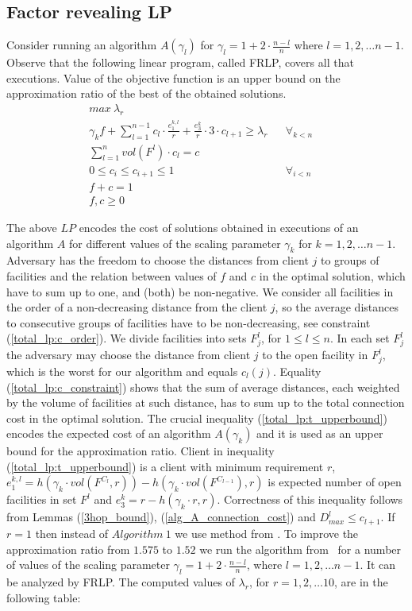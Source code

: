 \documentclass{llncs}
\begin{document}
\subsection{Factor revealing LP}
\label{lp_factor_revel}
Consider running an algorithm $A(\gamma_l)$ for $\gamma_l = 1 + 2 \cdot \frac{n - l}{n}$ where $l = 1, 2, \dots n-1$. Observe that the following linear program, called FRLP, covers all that executions. Value of the objective function is an upper bound on the approximation ratio of the best of the obtained solutions.
\begin{eqnarray}
  \label{total_lp:max}
  max~\lambda_r && \\
\label{total_lp:t_upperbound}
  \gamma_k f + \sum_{l = 1}^{n-1} c_l \cdot \frac{e_1^{k, l}}{r} + \frac{e_3^k}{r} \cdot 3 \cdot c_{l+1} \geq \lambda_r &&  \forall_{k < n}\\
\label{total_lp:c_constraint}
  \sum_{l = 1}^{n}vol(F^l) \cdot c_l = c && \\
\label{total_lp:c_order}
  0 \leq c_i \leq c_{i+1} \leq 1&&\forall_{i < n}~~~~~\\
\label{total_lp:opt_sol}
  f + c = 1 && \\
f, c\geq 0 &&
\end{eqnarray}

The above $LP$ encodes the cost of solutions obtained in executions of an algorithm $A$ for different values of the scaling parameter $\gamma_k$ for $k = 1, 2, \dots n-1$. Adversary has the freedom to choose the distances from client $j$ to groups of facilities and the relation between values of $f$ and $c$ in the optimal solution, which have to sum up to one, and (both) be non-negative. We consider all facilities in the order of a non-decreasing distance from the client $j$, so the average distances to consecutive groups of facilities have to be non-decreasing, see constraint (\ref{total_lp:c_order}). We divide facilities into sets $F_j^l$, for $1 \leq l \leq n$. In each set $F_j^l$ the adversary may choose the distance from client $j$ to the open facility in $F_j^l$, which is the worst for our algorithm and equals $c_l(j)$. Equality (\ref{total_lp:c_constraint}) shows that the sum of average distances, each weighted by the volume of facilities at such distance, has to sum up to the total connection cost in 
the optimal solution.  
The crucial inequality (\ref{total_lp:t_upperbound}) encodes the expected cost of an algorithm $A(\gamma_k)$ and it is used as an upper bound for the approximation ratio. Client in inequality (\ref{total_lp:t_upperbound}) is a client with minimum requirement $r$,
$e_1^{k,l} = h(\gamma_k \cdot vol(F^{C_l}, r)) - h(\gamma_k \cdot vol(F^{C_{l-1}}), r)$ is expected number of open facilities in set $F^l$ and $e_3^{k} = r - h(\gamma_k \cdot r, r)$. Correctness of this inequality follows from Lemmas (\ref{3hop_bound}), (\ref{alg_A_connection_cost}) and $D_{max}^{l} \leq c_{l+1}$.
If $r = 1$ then instead of $Algorithm~1$ we use method from \cite{Yan}. To improve the approximation ratio from $1.575$ to $1.52$ we run the algorithm from~\cite{Yan} for a number of values of the scaling parameter $\gamma_l = 1 + 2 \cdot \frac{n-l}{n}$, where $l = 1, 2,\ldots n-1$. It can be analyzed by FRLP. The computed values of $\lambda_r$, for $r = 1, 2, \dots 10$, are in the following table:
\end{document}
